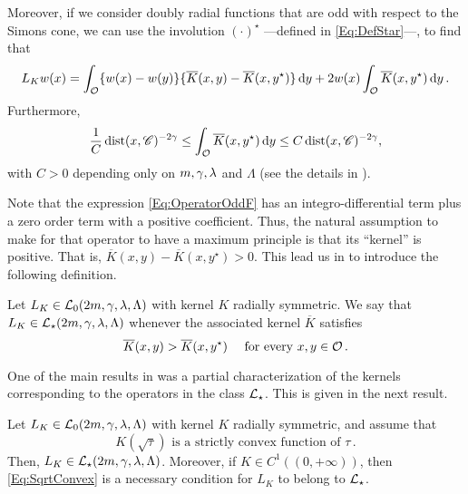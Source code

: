 Moreover, if we consider doubly radial functions that are odd with respect to the Simons cone, we can use the involution $(\cdot)^\star$ ---defined in \eqref{Eq:DefStar}---, to find that
\begin{equation}
\label{Eq:OperatorOddF}
L_K w (x) = \int_{\mathcal{O}} \{w(x) - w(y) \} \{\overline{K}(x, y) - \overline{K}(x, y^\star)  \} \,\mathrm{d} y +  2 w(x) \int_{\mathcal{O}} \overline{K}(x, y^\star) \,\mathrm{d} y \,.
\end{equation}
Furthermore,
\begin{equation}
\label{Eq:ZeroOrderTerm}
\frac{1}{C} \operatorname{dist}(x,\mathscr{C})^{-2\gamma} \leq \int_{\mathcal{O}} \overline{K}(x, y^\star) \,\mathrm{d} y \leq C \operatorname{dist}(x,\mathscr{C})^{-2\gamma},
\end{equation}
with $C>0$ depending only on $m, \gamma, \lambda$ and $\Lambda$ (see the details in \cite{FelipeSanz-Perela:IntegroDifferentialI}).


Note that the expression \eqref{Eq:OperatorOddF} has an integro-differential term plus a zero order term with a positive coefficient. Thus, the natural assumption to make for that operator to have a maximum principle is that its ``kernel'' is positive. That is, $\overline{K}(x, y) - \overline{K}(x, y^\star)>0$. This lead us in \cite{FelipeSanz-Perela:IntegroDifferentialI} to introduce the following definition.

\begin{definition}
	Let $L_K \in \mathcal{L}_0(2m,\gamma,\lambda, \Lambda)$ with kernel $K$ radially symmetric. We say that $L_K\in \mathcal{L}_\star (2m,\gamma,\lambda, \Lambda)$ whenever the associated kernel $\overline{K}$ satisfies
	\begin{equation}
	\label{Eq:KernelInequality}
	\overline{K}(x,y) > \overline{K}(x, y^\star) \quad \text{ for every }x,y \in \mathcal{O}\,.
	\end{equation}
\end{definition}

One of the main results in \cite{FelipeSanz-Perela:IntegroDifferentialI} was a partial characterization of the kernels corresponding to the operators in the class $\mathcal{L}_\star$. This is given in the next result.

\begin{theorem}
	\label{Th:CharacterizationLstar}
	Let $L_K \in \mathcal{L}_0(2m,\gamma,\lambda, \Lambda)$ with kernel $K$ radially symmetric, and assume that 
	\begin{equation}
	\label{Eq:SqrtConvex}	
	K(\sqrt{\tau}) \text{ is a strictly convex function of }\tau\,.
	\end{equation}
	Then, $L_K\in \mathcal{L}_\star(2m,\gamma,\lambda, \Lambda)$. Moreover, if $K\in C^1((0,+\infty))$, then \eqref{Eq:SqrtConvex} is a necessary condition for $L_K$ to belong to $\mathcal{L}_\star$.
\end{theorem}

